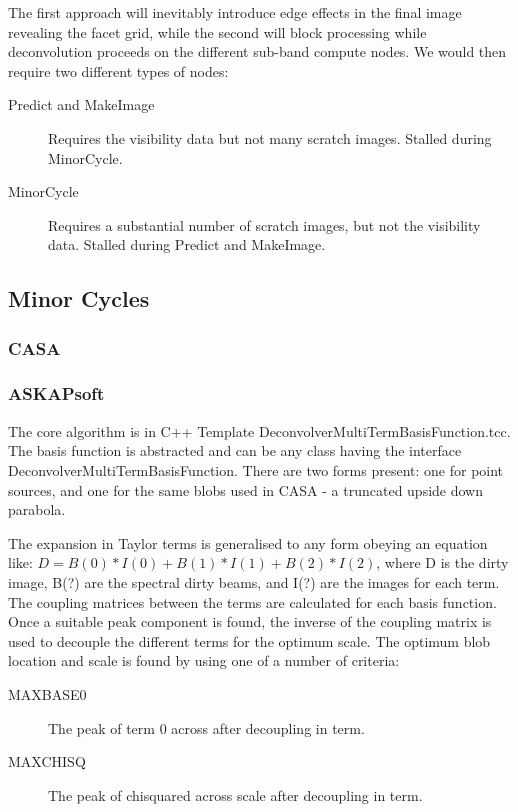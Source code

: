 \documentclass[11pt,a4paper]{article}
\begin{document}
The first approach will inevitably introduce edge effects in the final image revealing the facet grid, while the second will block processing while deconvolution proceeds on the different sub-band compute nodes. We would then require two different types of nodes:
\begin{description}
\item[Predict and MakeImage] Requires the visibility data but not many scratch images. Stalled during MinorCycle.
\item[MinorCycle] Requires a substantial number of scratch images, but not the visibility data. Stalled during Predict and MakeImage.	
\end{description}


\subsection{Minor Cycles}

\subsubsection{CASA}

\subsubsection{ASKAPsoft}
The core algorithm is in C++ Template DeconvolverMultiTermBasisFunction.tcc. The basis function is abstracted and can be any class having the interface DeconvolverMultiTermBasisFunction. There are two forms present: one for point sources, and one for the same blobs used in CASA - a truncated upside down parabola. 

The expansion in Taylor terms is generalised to any form obeying an equation like: $D = B(0)*I(0) + B(1)*I(1) + B(2)*I(2)$, where D is the dirty image, B(?) are the spectral dirty beams, and I(?) are the images for each term. The coupling matrices between the terms are calculated for each basis function. Once a suitable peak component is found, the inverse of the coupling matrix is used to decouple the different terms for the optimum scale. The optimum blob location and scale is found by using one of a number of criteria:
\begin{description}
\item[MAXBASE0] The peak of term 0 across after decoupling in term.
\item[MAXCHISQ] The peak of chisquared across scale after decoupling in term.
\end{description}
\end{document}

